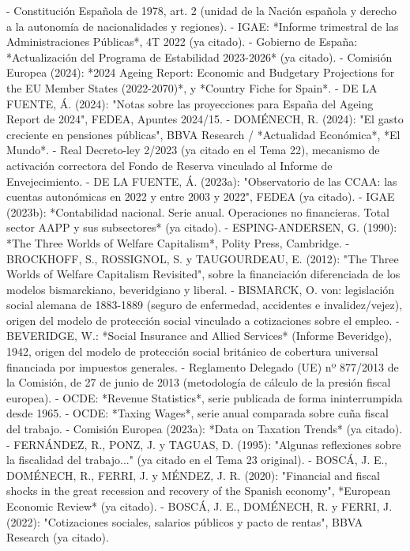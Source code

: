 \documentclass[10pt,a4paper]{article}
\begin{document}
- Constitución Española de 1978, art. 2 (unidad de la Nación española y derecho a la autonomía de nacionalidades y regiones).
- IGAE: *Informe trimestral de las Administraciones Públicas*, 4T 2022 (ya citado).
- Gobierno de España: *Actualización del Programa de Estabilidad 2023-2026* (ya citado).
- Comisión Europea (2024): *2024 Ageing Report: Economic and Budgetary Projections for the EU Member States (2022-2070)*, y *Country Fiche for Spain*.
- DE LA FUENTE, Á. (2024): "Notas sobre las proyecciones para España del Ageing Report de 2024", FEDEA, Apuntes 2024/15.
- DOMÉNECH, R. (2024): "El gasto creciente en pensiones públicas", BBVA Research / *Actualidad Económica*, *El Mundo*.
- Real Decreto-ley 2/2023 (ya citado en el Tema 22), mecanismo de activación correctora del Fondo de Reserva vinculado al Informe de Envejecimiento.
- DE LA FUENTE, Á. (2023a): "Observatorio de las CCAA: las cuentas autonómicas en 2022 y entre 2003 y 2022", FEDEA (ya citado).
- IGAE (2023b): *Contabilidad nacional. Serie anual. Operaciones no financieras. Total sector AAPP y sus subsectores* (ya citado).
- ESPING-ANDERSEN, G. (1990): *The Three Worlds of Welfare Capitalism*, Polity Press, Cambridge.
- BROCKHOFF, S., ROSSIGNOL, S. y TAUGOURDEAU, E. (2012): "The Three Worlds of Welfare Capitalism Revisited", sobre la financiación diferenciada de los modelos bismarckiano, beveridgiano y liberal.
- BISMARCK, O. von: legislación social alemana de 1883-1889 (seguro de enfermedad, accidentes e invalidez/vejez), origen del modelo de protección social vinculado a cotizaciones sobre el empleo.
- BEVERIDGE, W.: *Social Insurance and Allied Services* (Informe Beveridge), 1942, origen del modelo de protección social británico de cobertura universal financiada por impuestos generales.
- Reglamento Delegado (UE) nº 877/2013 de la Comisión, de 27 de junio de 2013 (metodología de cálculo de la presión fiscal europea).
- OCDE: *Revenue Statistics*, serie publicada de forma ininterrumpida desde 1965.
- OCDE: *Taxing Wages*, serie anual comparada sobre cuña fiscal del trabajo.
- Comisión Europea (2023a): *Data on Taxation Trends* (ya citado).
- FERNÁNDEZ, R., PONZ, J. y TAGUAS, D. (1995): "Algunas reflexiones sobre la fiscalidad del trabajo..." (ya citado en el Tema 23 original).
- BOSCÁ, J. E., DOMÉNECH, R., FERRI, J. y MÉNDEZ, J. R. (2020): "Financial and fiscal shocks in the great recession and recovery of the Spanish economy", *European Economic Review* (ya citado).
- BOSCÁ, J. E., DOMÉNECH, R. y FERRI, J. (2022): "Cotizaciones sociales, salarios públicos y pacto de rentas", BBVA Research (ya citado).
\end{document}
